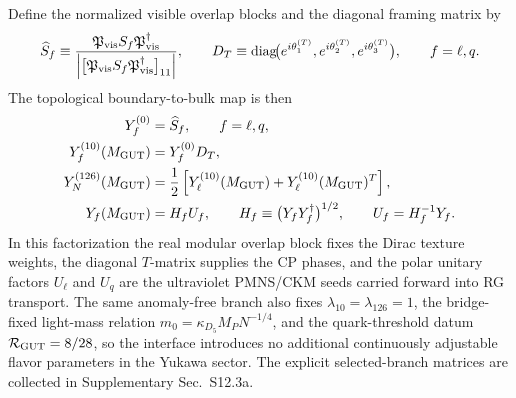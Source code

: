 \documentclass[11pt]{article}
\begin{document}
Define the normalized visible overlap blocks and the diagonal framing matrix by
\begin{equation}
 \widehat S_f
 \equiv
 \frac{\mathfrak P_{\rm vis}S_f\mathfrak P_{\rm vis}^{\dagger}}{\left|\bigl[\mathfrak P_{\rm vis}S_f\mathfrak P_{\rm vis}^{\dagger}\bigr]_{11}\right|},
 \qquad
 D_T\equiv\operatorname{diag}\!\bigl(e^{i\theta_1^{(T)}},e^{i\theta_2^{(T)}},e^{i\theta_3^{(T)}}\bigr),
 \qquad f=\ell,q.
\end{equation}
The topological boundary-to-bulk map is then
\begin{align}
 Y_f^{(0)}&=\widehat S_f, \qquad f=\ell,q, \notag\\
 Y_f^{(10)}(M_{\rm GUT})&=Y_f^{(0)}D_T, \notag\\
 Y_N^{(126)}(M_{\rm GUT})&=\frac12\left[Y_{\ell}^{(10)}(M_{\rm GUT})+Y_{\ell}^{(10)}(M_{\rm GUT})^T\right], \notag\\
 Y_f(M_{\rm GUT})&=H_fU_f, \qquad H_f\equiv\bigl(Y_fY_f^{\dagger}\bigr)^{1/2}, \qquad U_f=H_f^{-1}Y_f.
\end{align}
In this factorization the real modular overlap block fixes the Dirac texture weights, the diagonal $T$-matrix supplies the CP phases, and the polar unitary factors $U_{\ell}$ and $U_q$ are the ultraviolet PMNS/CKM seeds carried forward into RG transport. The same anomaly-free branch also fixes $\lambda_{10}=\lambda_{126}=1$, the bridge-fixed light-mass relation $m_0=\kappa_{D_5}M_PN^{-1/4}$, and the quark-threshold datum $\mathcal R_{\rm GUT}=8/28$, so the interface introduces no additional continuously adjustable flavor parameters in the Yukawa sector. The explicit selected-branch matrices are collected in Supplementary Sec.~S12.3a.
\end{document}
